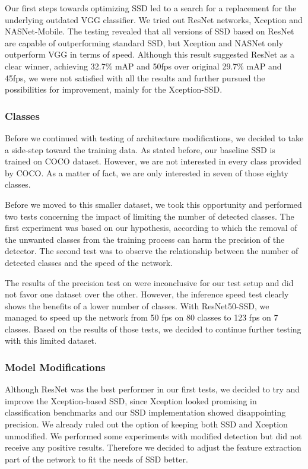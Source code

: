 Our first steps towards optimizing SSD led to a search for a replacement for the underlying outdated VGG classifier. We tried out ResNet networks, Xception and NASNet-Mobile. The testing revealed that all versions of SSD based on ResNet are capable of outperforming standard SSD, but Xception and NASNet only outperform VGG in terms of speed. Although this result suggested ResNet as a clear winner, achieving 32.7\% mAP and 50fps over original 29.7\% mAP and 45fps, we were not satisfied with all the results and further pursued the possibilities for improvement, mainly for the Xception-SSD. 

\subsubsection*{Classes}
Before we continued with testing of architecture modifications, we decided to take a side-step toward the training data. As stated before, our baseline SSD is trained on COCO dataset. However, we are not interested in every class provided by COCO. As a matter of fact, we are only interested in seven of those eighty classes.

Before we moved to this smaller dataset, we took this opportunity and performed two tests concerning the impact of limiting the number of detected classes. The first experiment was based on our hypothesis, according to which the removal of the unwanted classes from the training process can harm the precision of the detector. The second test was to observe the relationship between the number of detected classes and the speed of the network.

The results of the precision test on were inconclusive for our test setup and did not favor one dataset over the other. However, the inference speed test clearly shows the benefits of a lower number of classes. With ResNet50-SSD, we managed to speed up the network from 50 fps on 80 classes to 123 fps on 7 classes. Based on the results of those tests, we decided to continue further testing with this limited dataset.

\subsubsection*{Model Modifications}
Although ResNet was the best performer in our first tests, we decided to try and improve the Xception-based SSD, since Xception looked promising in classification benchmarks and our SSD implementation showed disappointing precision. We already ruled out the option of keeping both SSD and Xception unmodified. We performed some experiments with modified detection but did not receive any positive results. Therefore we decided to adjust the feature extraction part of the network to fit the needs of SSD better.

